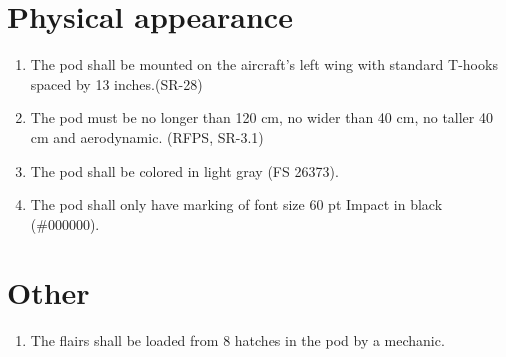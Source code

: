 \documentclass[Main]{subfiles}
\begin{document}
\section{Physical appearance}
\begin{enumerate}[label=\bfseries DDD-5.\arabic*:]

\item The pod shall be mounted on the aircraft's left wing with standard T-hooks spaced by 13 inches.(SR-28)

\item The pod must be no longer than 120 cm, no wider than 40 cm, no taller 40 cm and aerodynamic. (RFPS, SR-3.1)

\item The pod shall be colored in light gray (FS 26373).

\item The pod shall only have marking of font size 60 pt Impact in black (\#000000).

\end{enumerate}


\section{Other}

\begin{enumerate}[label=\bfseries DDD-6.\arabic*:]

\item The flairs shall be loaded from 8 hatches in the pod by a mechanic.

\end{enumerate}
\end{document}
